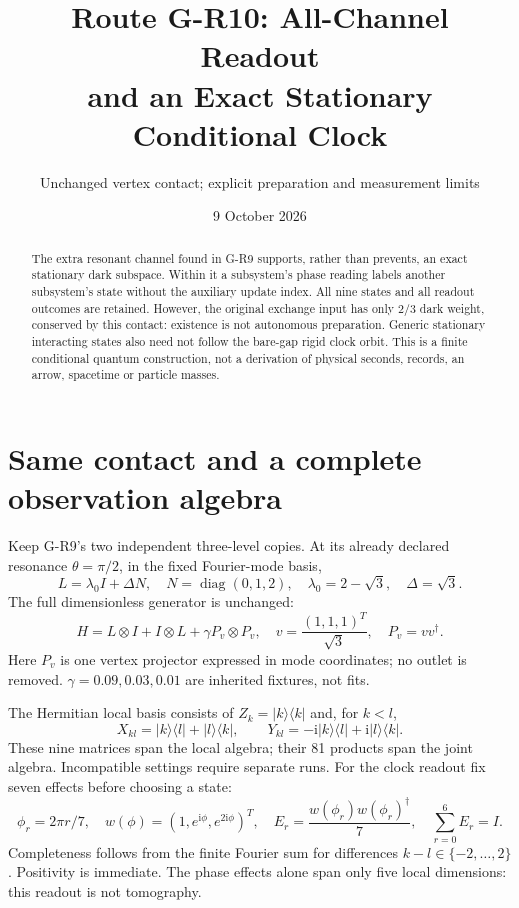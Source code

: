 \documentclass[11pt,a4paper]{article}
\title{Route G-R10: All-Channel Readout\\and an Exact Stationary Conditional Clock}
\author{Unchanged vertex contact; explicit preparation and measurement limits}
\date{9 October 2026}
\newcommand{\ii}{\mathrm i}
\newcommand{\ket}[1]{|#1\rangle}
\newcommand{\bra}[1]{\langle#1|}
\begin{document}
\maketitle
\begin{abstract}
The extra resonant channel found in G-R9 supports, rather than prevents,
an exact stationary dark subspace. Within it a subsystem's phase reading
labels another subsystem's state without the auxiliary update index.
All nine states and all readout outcomes are retained. However, the
original exchange input has only $2/3$ dark weight, conserved by this
contact: existence is not autonomous preparation. Generic stationary
interacting states also need not follow the bare-gap rigid clock orbit.
This is a finite conditional quantum construction, not a derivation of
physical seconds, records, an arrow, spacetime or particle masses.
\end{abstract}

\section{Same contact and a complete observation algebra}
Keep G-R9's two independent three-level copies. At its already declared
resonance $\theta=\pi/2$, in the fixed Fourier-mode basis,
\begin{equation}
 L=\lambda_0 I+\Delta N,\quad N=\operatorname{diag}(0,1,2),\quad
 \lambda_0=2-\sqrt3,\quad\Delta=\sqrt3.
\end{equation}
The full dimensionless generator is unchanged:
\begin{equation}
 H=L\otimes I+I\otimes L+\gamma P_v\otimes P_v,
 \quad v=\frac{(1,1,1)^T}{\sqrt3},\quad P_v=vv^\dagger.\label{H}
\end{equation}
Here $P_v$ is one vertex projector expressed in mode coordinates; no
outlet is removed. $\gamma=0.09,0.03,0.01$ are inherited fixtures, not fits.

The Hermitian local basis consists of $Z_k=\ket k\bra k$ and, for $k<l$,
\begin{equation}
 X_{kl}=\ket k\bra l+\ket l\bra k,\qquad
 Y_{kl}=-\ii\ket k\bra l+\ii\ket l\bra k.
\end{equation}
These nine matrices span the local algebra; their 81 products span the
joint algebra. Incompatible settings require separate runs. For the
clock readout fix seven effects before choosing a state:
\begin{equation}
 \phi_r=2\pi r/7,\quad w(\phi)=(1,e^{\ii\phi},e^{2\ii\phi})^T,
 \quad E_r=\frac{w(\phi_r)w(\phi_r)^\dagger}{7},\quad
 \sum_{r=0}^6 E_r=I.\label{POVM}
\end{equation}
Completeness follows from the finite Fourier sum for differences
$k-l\in\{-2,\ldots,2\}$. Positivity is immediate. The phase effects
alone span only five local dimensions: this readout is not tomography.
\end{document}

